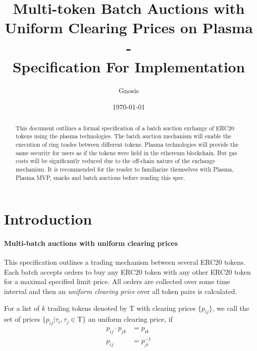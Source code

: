 \documentclass[11pt,parskip=full]{scrartcl}%
\title{
  Multi-token Batch Auctions with Uniform Clearing Prices on Plasma\\
  - \\
  \Large Specification For Implementation}
\author{Gnosis}
\date{\today}
\newcommand{\Tau}{\mathrm{T}}
\newcommand*{\erc}{ERC20 }
\begin{document}
\maketitle


\begin{abstract}

This document outlines a formal specification of a batch auction exchange of ERC20 tokens using the plasma technologies. 
The batch auction mechanism will enable the execution of ring trades between different tokens. 
Plasma technologies will provide the same security for users as if the tokens were held in the ethereum blockchain. 
But gas costs will be significantly reduced due to the off-chain nature of the exchange mechanism. 
It is recommended for the reader to familiarize themselves with Plasma\cite{plasma}, Plasma MVP\cite{MVP}, snarks\cite{snarks} and batch auctions\cite{batch} before reading this spec. 

\end{abstract}

\tableofcontents

\newpage
\section{Introduction}
\label{sec:introduction}

\paragraph{Multi-batch auctions with uniform clearing prices}

This specification outlines a trading mechanism between several \erc tokens. Each batch accepts orders to buy any \erc token with any other \erc token for a maximal specified limit price. All orders are collected over some time interval and then an \emph{uniform clearing price} over all token pairs is calculated. 

For a list of $k$ trading tokens denoted by $\Tau$ with clearing prices $\{p_{ij}\}$, we call the set of prices $\{p_{ij}| \tau_i, \tau_j \in \Tau\}$ an uniform clearing price, if
\begin{align} \label{eq:arbitrage_freeness}
  p_{ij} \cdot p_{jk} &= p_{ik}\\
  p_{ij} &= p_{ji}^{-1}
\end{align}
\end{document}
